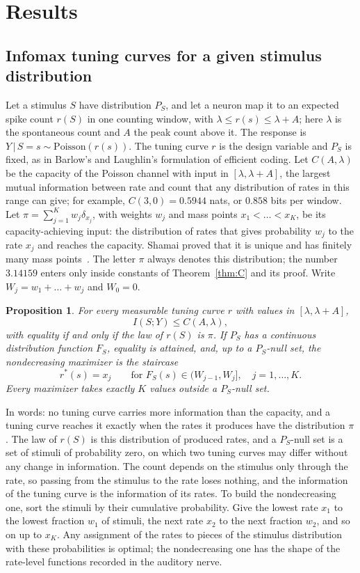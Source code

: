 \documentclass[10pt,letterpaper]{article}
\newtheorem{proposition}[theorem]{Proposition}
\begin{document}
\section{Results}\label{sec:results}

\subsection{Infomax tuning curves for a given stimulus distribution}\label{sec:laughlin}

Let a stimulus $S$ have distribution $P_S$, and let a neuron map it to an expected spike count $r(S)$ in one counting window, with
$\lambda\le r(s)\le\lambda+A$; here $\lambda$ is the spontaneous count and $A$ the peak count above it. The response is
$Y\,|\,S=s\sim\mathrm{Poisson}(r(s))$. The tuning curve $r$ is the design variable and $P_S$ is fixed, as in Barlow's and Laughlin's
formulation of efficient coding. Let $C(A,\lambda)$ be the capacity of the Poisson channel with input in $[\lambda,\lambda+A]$, the
largest mutual information between rate and count that any distribution of rates in this range can give; for example,
$C(3,0)=0.5944$ nats, or $0.858$ bits per window. Let
$\pi=\sum_{j=1}^{K}w_j\delta_{x_j}$, with weights $w_j$ and mass points $x_1<\dots<x_K$, be its capacity-achieving input: the
distribution of rates that gives probability $w_j$ to the rate $x_j$ and reaches the capacity. Shamai proved that it is unique and has
finitely many mass points~\cite{Shamai1990}. The letter $\pi$ always denotes this distribution; the number $3.14159$ enters only
inside constants of Theorem~\ref{thm:C} and its proof. Write $W_j=w_1+\dots+w_j$ and $W_0=0$.

\begin{proposition}\label{prop:L1}
For every measurable tuning curve $r$ with values in $[\lambda,\lambda+A]$,
\[
I(S;Y)\le C(A,\lambda),
\]
with equality if and only if the law of $r(S)$ is $\pi$. If $P_S$ has a continuous distribution function $F_S$, equality is attained,
and, up to a $P_S$-null set, the nondecreasing maximizer is the staircase
\[
r^*(s)=x_j\qquad\text{for } F_S(s)\in(W_{j-1},W_j],\quad j=1,\dots,K .
\]
Every maximizer takes exactly $K$ values outside a $P_S$-null set.
\end{proposition}

In words: no tuning curve carries more information than the capacity, and a tuning curve reaches it exactly when the rates it
produces have the distribution $\pi$. The law of $r(S)$ is this distribution of produced rates, and a $P_S$-null set is a set of
stimuli of probability zero, on which two tuning curves may differ without any change in information. The count depends on the
stimulus only through the rate, so passing from the stimulus to the rate loses nothing, and the information of the tuning curve is
the information of its rates. To build the nondecreasing one, sort the stimuli by their cumulative probability. Give the lowest
rate $x_1$ to the lowest fraction $w_1$ of stimuli, the next rate $x_2$ to the next fraction $w_2$, and so on up to $x_K$. Any
assignment of the rates to pieces of the stimulus distribution with these probabilities is optimal; the nondecreasing one has the shape
of the rate-level functions recorded in the auditory nerve.
\end{document}
